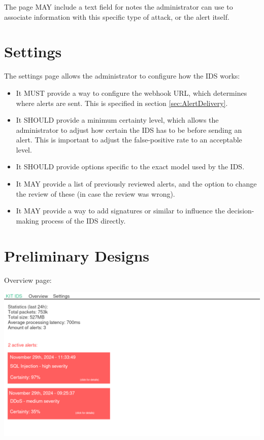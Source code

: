 \documentclass[oneside, english]{reports/assets/sdqtechreport}
\begin{document}
The page MAY include a text field for notes the administrator can use to
associate information with this specific type of attack, or the alert itself.

\section{Settings}
\label{sec:UserInterfaceSettings}

The settings page allows the administrator to configure how the IDS works:

\begin{itemize}
	\item It MUST provide a way to configure the webhook URL, which determines where
	      alerts are sent. This is specified in section \ref{sec:AlertDelivery}.
	\item It SHOULD provide a minimum certainty level, which allows the administrator to
	      adjust how certain the IDS has to be before sending an alert. This is important
	      to adjust the false-positive rate to an acceptable level.
	\item It SHOULD provide options specific to the exact model used by the IDS.
	\item It MAY provide a list of previously reviewed alerts, and the option to change
	      the review of these (in case the review was wrong).
	\item It MAY provide a way to add signatures or similar to influence the
	      decision-making process of the IDS directly.
\end{itemize}

\section{Preliminary Designs}
\label{sec:UserInterfaceDesigns}

Overview page:

\includegraphics{ui-overview}
\end{document}
